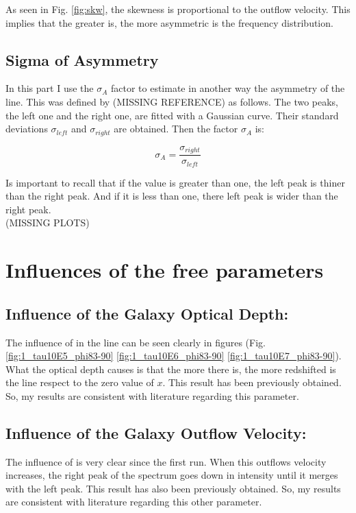 As seen in Fig. \ref{fig:skw}, the skewness is proportional to the outflow velocity. This implies that the greater \vout is, the more asymmetric is the \lya frequency distribution.\\

\subsection{Sigma of Asymmetry}
In this part I use the $\sigma_A$ factor to estimate in another way the asymmetry of the \lya line. This was defined by (MISSING REFERENCE) as follows. The two peaks, the left one and the right one, are fitted with a Gaussian curve. Their standard deviations $\sigma_{left}$ and $\sigma_{right}$ are obtained. Then the factor $\sigma_A$ is:

\begin{equation}
\sigma_A = \frac{\sigma_{right}}{\sigma_{left}}
\end{equation}

Is important to recall that if the value is greater than one, the left peak is thiner than the right peak. And if it is less than one, there left peak is wider than the right peak.\\

(MISSING PLOTS)

\section{Influences of the free parameters}

\subsection{Influence of the Galaxy Optical Depth: \tauh}
The influence of \tauh in the \lya line can be seen clearly in figures (Fig. \ref{fig:1_tau10E5_phi83-90} \ref{fig:1_tau10E6_phi83-90} \ref{fig:1_tau10E7_phi83-90}). What the optical depth causes is that the more \tauh there is, the more redshifted is the line respect to the zero value of $x$. This result has been previously obtained. So, my results are consistent with literature regarding this parameter.\\

\subsection{Influence of the Galaxy Outflow Velocity: \vout}
The influence of \vout is very clear since the first run. When this outflows velocity increases, the right peak of the spectrum goes down in intensity until it merges with the left peak.  This result has also been previously obtained. So, my results are consistent with literature regarding this other parameter.\\

